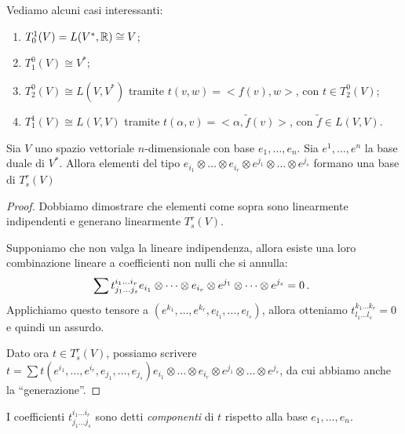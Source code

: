 \begin{example}
	Vediamo alcuni casi interessanti:
	\begin{enumerate}
		\item $T_0^1(V) = L(V^*,\mathbb R) \cong V$;
		\item $T_1^0(V) \cong V^*$;
		\item $T_2^0(V) \cong L(V,V^*)$ tramite $t(v,w) = <f(v),w>$, con $t\in T_2^0(V)$;
		\item $T_1^1(V) \cong L(V,V)$ tramite $t(\alpha,v) = <\alpha, \tilde f (v)>$, con $\tilde f\in L(V,V)$.
	\end{enumerate}
\end{example}

\begin{proposition}
	Sia $V$ uno spazio vettoriale $n$-dimensionale con base $e_1,\dots,e_n$. Sia $e^1,\dots,e^n$ la base duale di $V^*$. Allora elementi del tipo $e_{i_1}\otimes \dots \otimes e_{i_r}\otimes e^{j_1}\otimes \dots \otimes e^{j_s}$ formano una base di $T_s^r(V)$
\end{proposition}
\begin{proof}
	Dobbiamo dimostrare che elementi come sopra sono linearmente indipendenti e generano linearmente $T_s^r(V)$.
	
	Supponiamo che non valga la lineare indipendenza, allora esiste una loro combinazione lineare a coefficienti non nulli che si annulla:
	\begin{equation*}
		\sum t_{j_1\dots j_s}^{i_1\dots i_r} e_{i_1}\otimes \dots \otimes e_{i_r}\otimes e^{j_1}\otimes \dots \otimes e^{j_s} = 0\, \text{. }
	\end{equation*}
	Applichiamo questo tensore a $(e^{k_1},\dots,e^{k_r},e_{l_1},\dots,e_{l_s})$, allora otteniamo $t_{l_1\dots l_s}^{k_1 \dots k_r} = 0$ e quindi un assurdo.
	
	Dato ora $t\in T_s^r(V)$, possiamo scrivere $t = \sum t(e^{i_1},\dots, e^{i_r},e_{j_1},\dots, e_{j_s})e_{i_1}\otimes \dots \otimes e_{i_r}\otimes e^{j_1}\otimes \dots \otimes e^{j_s}$, da cui abbiamo anche la ``generazione''.
\end{proof}

\begin{definition}
	I coefficienti $t_{j_1\dots j_s}^{i_1\dots i_r}$ sono detti \emph{componenti} di $t$ rispetto alla base $e_1,\dots,e_n$.
\end{definition}

